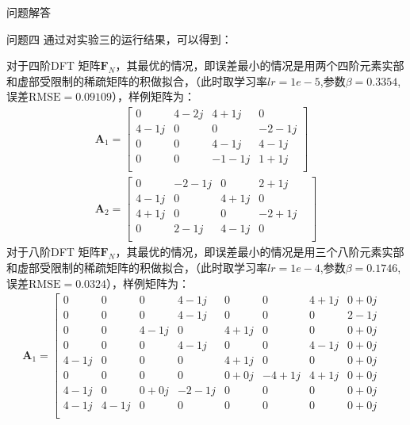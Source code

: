 \documentclass[11pt]{article}
\begin{document}
\begin{section}{问题解答}
\begin{subsection}{问题四}
   通过对实验三的运行结果，可以得到：\par
   对于四阶DFT 矩阵$\mathbf{F}_N$，其最优的情况，即误差最小的情况是用两个四阶元素实部和虚部受限制的稀疏矩阵的积做拟合，（此时取学习率$lr= 1e-5$,参数$\beta=0.3354$,误差$\mathrm{RMSE}=0.09109$），样例矩阵为：
   \begin{align}
     \mathbf{A}_1=\left[
       \begin{matrix}
         0    & 4-2j & 4+1j  & 0     \\
         4-1j & 0    & 0     & -2-1j \\
         0    & 0    & 4-1j  & 4-1j  \\
         0    & 0    & -1-1j & 1+1j  \\
       \end{matrix}
     \right] \\
     \mathbf{A}_2=\left[
       \begin{matrix}
         0    & -2-1j & 0    & 2+1j  & \\
         4-1j & 0     & 4+1j & 0     & \\
         4+1j & 0     & 0    & -2+1j & \\
         0    & 2-1j  & 4-1j & 0     & \\
       \end{matrix}
       \right]
   \end{align}
   对于八阶DFT 矩阵$\mathbf{F}_N$，其最优的情况，即误差最小的情况是用三个八阶元素实部和虚部受限制的稀疏矩阵的积做拟合，（此时取学习率$lr= 1e-4$,参数$\beta=0.1746$,误差$\mathrm{RMSE}=0.0324$），样例矩阵为：
   \begin{align}
     \mathbf{A}_1=\left[
       \begin{matrix}
         0    & 0    & 0    & 4-1j  & 0    & 0     & 4+1j & 0+0j & \\
         0    & 0    & 0    & 4-1j  & 0    & 0     & 0    & 2-1j & \\
         0    & 0    & 4-1j & 0     & 4+1j & 0     & 0    & 0+0j & \\
         0    & 0    & 0    & 4-1j  & 0    & 0     & 4-1j & 0+0j & \\
         4-1j & 0    & 0    & 0     & 4+1j & 0     & 0    & 0+0j & \\
         0    & 0    & 0    & 0     & 0+0j & -4+1j & 4+1j & 0+0j & \\
         4-1j & 0    & 0+0j & -2-1j & 0    & 0     & 0    & 0+0j & \\
         4-1j & 4-1j & 0    & 0     & 0    & 0     & 0    & 0+0j & \\

\end{matrix}
\end{align}
\end{subsection}
\end{section}
\end{document}
